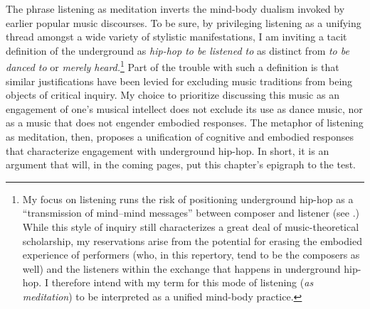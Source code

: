 The phrase listening as meditation inverts the mind-body dualism invoked by earlier popular music
discourses. To be sure, by privileging listening as a unifying thread amongst a wide variety of
stylistic manifestations, I am inviting a tacit definition of the underground as \emph{hip-hop to
be listened to} as distinct from \emph{to be danced to} or \emph{merely heard.}\footnote{
    My focus on listening runs the risk of positioning underground hip-hop as a ``transmission of 
    mind--mind messages'' between composer and listener (see 
    \autocite[20]{suzanneg.cusickFeministTheoryMusic1994}.) 
    While this style of inquiry still characterizes a great deal of music-theoretical scholarship,
    my reservations arise from the potential for erasing the embodied experience of performers 
    (who, in this repertory, tend to be the composers as well) and the listeners within the exchange 
    that happens in underground hip-hop. I therefore intend with my term for this mode of listening
    (\emph{as meditation}) to be interpreted as a unified mind-body practice.}
Part of the trouble with such a definition is that similar justifications have been levied for excluding
music traditions from being objects of critical inquiry. My choice to prioritize discussing this music 
as an engagement of one's musical intellect does not exclude its use as dance music, nor as a music that
does not engender embodied responses. The metaphor of listening as meditation, then, proposes a unification
of cognitive and embodied responses that characterize engagement with underground hip-hop. In short, it is
an argument that will, in the coming pages, put this chapter's epigraph to the test.


